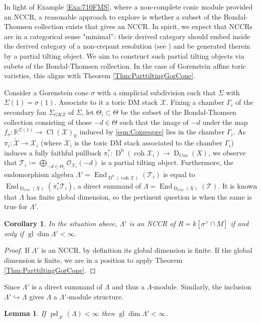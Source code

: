 \documentclass[reqno, 12pt]{amsart}
\newtheorem{lemma}[theorem]{Lemma}
\newtheorem{corollary}[theorem]{Corollary}
\theoremstyle{definition}
\numberwithin{equation}{section}
\newcommand{\dbcoh}[1]{\operatorname{D}^{\operatorname{b}}(\operatorname{coh }#1)}
\newcommand{\R}{\mathbb{R}}
\def\O{\mathcal{O}}
\newcommand{\End}{\operatorname{End}}
\newcommand{\gldim}{\operatorname{gl}\dim}
\begin{document}
In light of Example \ref{Exa:710FMS}, where a non-complete conic module provided an NCCR, a reasonable approach to explore is whether a subset of the Bondal-Thomsen collection exists that gives an NCCR. In spirit, we expect that NCCRs are in a categorical sense "minimal'': their derived category should embed inside the derived category of a non-crepant resolution (see \cite[$\S$ 3.3]{VdB23}) and be generated therein by a partial tilting object. We aim to construct such partial tilting objects via subets of the Bondal-Thomsen collection. 
In the case of Gorenstein affine toric varieties, this aligns with Theorem \ref{Thm:ParttiltingGorCone}. 

Consider a Gorenstein cone $\sigma$ with a simplicial subdivision such that $\Sigma$ with $\Sigma(1)=\sigma(1)$. Associate to it a toric DM stack $\mathcal{X}$. Fixing a chamber $\Gamma_i$ of the secondary fan $\Sigma_{GKZ}$ of $\Sigma$, let $\Theta_i\subset \Theta$ be the subset of the Bondal-Thomsen collection consisting of those $-d\in \Theta$ such that the image of $-d$ under the map $f_\sigma:\R^{\Sigma(1)}\rightarrow\operatorname{Cl}(\mathcal{X})_\R$ induced by \eqref{eqn:Coxseqpre} lies in the chamber $\Gamma_i$. As $\pi_i:\widetilde{\mathcal{X}}\rightarrow \mathcal{X}_i$ (where $\mathcal{X}_i$ is the toric DM stack associated to the chamber $\Gamma_i$) induces a fully faithful pullback $\pi_i^\ast:\dbcoh{\mathcal{X}_i}\rightarrow \operatorname{D}_{Cox}(X)$, we observe that $\mathcal{T}_i:=\bigoplus_{-d\in \Theta_i}\O_{\mathcal{X}_i}(-d)$ is a partial tilting object. Furthermore, the endomorphism algebra $\Lambda'=\End_{\dbcoh{\mathcal{X}}}(\mathcal{T}_i)$ is equal to $\End_{\operatorname{D}_{Cox}(X)}(\pi^\ast_i\mathcal{T}_i)$, a direct summand of $\Lambda=\End_{\operatorname{D}_{Cox}(X)}(\mathcal{T})$. It is known that $\Lambda$ has finite global dimension, so the pertinent question is when the same is true for $\Lambda'$.

\begin{corollary}
    \label{Cor:FinGlDimSubchamber}
    In the situation above, $\Lambda'$ is an NCCR of $R=k[\sigma^\vee\cap M]$ if and only if $\gldim\Lambda'<\infty$.
\end{corollary}
\begin{proof}
    If $\Lambda'$ is an NCCR, by definition its global dimension is finite. If the global dimension is finite, we are in a position to apply Theorem \ref{Thm:ParttiltingGorCone}.
\end{proof}

Since $\Lambda'$ is a direct summand of $\Lambda$ and thus a $\Lambda$-module. Similarly, the inclusion $\Lambda'\hookrightarrow \Lambda$ gives $\Lambda$ a $\Lambda'$-module structure. 
\begin{lemma}
    \label{Lem:GldimSummand}
    If $\operatorname{pd}_{\Lambda'}(\Lambda)<\infty$ then $\gldim\Lambda'<\infty$. 
\end{lemma}
\end{document}
